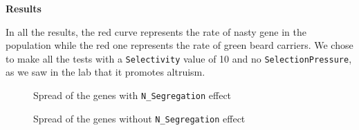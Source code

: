 \documentclass[12pt,a4paper]{article}
\newcommand{\parag}[1]{
  \vspace{8mm}
  \noindent
  {\LARGE\textbf{#1}}
  \vspace{3mm}
}
\begin{document}
\vspace{-1cm}
\parag{Results}

In all the results, the red curve represents the rate of nasty gene in the population while the red one represents the rate of green beard carriers. We chose to make all the tests with a \texttt{Selectivity} value of 10 and no \texttt{SelectionPressure}, as we saw in the lab that it promotes altruism.

\begin{figure}[htp] 
    \centering
    \hfill%
    \caption{Spread of the genes with \texttt{N\_Segregation} effect}
\end{figure}

\begin{figure}[htp] 
    \centering
    \hfill%
    \caption{Spread of the genes without \texttt{N\_Segregation} effect}
\end{figure}
\end{document}
